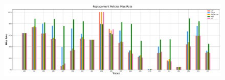 	\newpage
	\thispagestyle{empty}
	\begin{landscape}
		\vspace*{\fill}
		\begin{figure}[h!]
			\centering
			\includegraphics[width=\linewidth]{./pictures/miss_rate_traces.pdf}
		\end{figure}
		\vspace*{\fill}
	\end{landscape}

